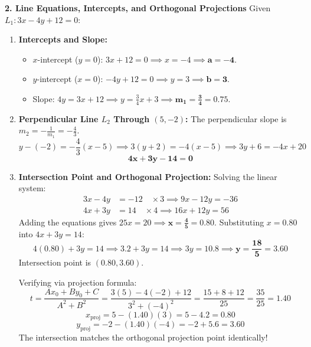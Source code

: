 \textbf{2. Line Equations, Intercepts, and Orthogonal Projections}
Given $L_1: 3x - 4y + 12 = 0$:
\begin{enumerate}
    \item \textbf{Intercepts and Slope:}
    \begin{itemize}
        \item $x$-intercept ($y=0$): $3x + 12 = 0 \implies x = -4 \implies \mathbf{a = -4}$.
        \item $y$-intercept ($x=0$): $-4y + 12 = 0 \implies y = 3 \implies \mathbf{b = 3}$.
        \item Slope: $4y = 3x + 12 \implies y = \frac{3}{4}x + 3 \implies \mathbf{m_1 = \frac{3}{4} = 0.75}$.
    \end{itemize}
    \item \textbf{Perpendicular Line $L_2$ Through $(5, -2)$:}
    The perpendicular slope is $m_2 = -\frac{1}{m_1} = -\frac{4}{3}$.
    $$y - (-2) = -\frac{4}{3}(x - 5) \implies 3(y + 2) = -4(x - 5) \implies 3y + 6 = -4x + 20$$
    $$\mathbf{4x + 3y - 14 = 0}$$
    \item \textbf{Intersection Point and Orthogonal Projection:}
    Solving the linear system:
    \begin{align*}
        3x - 4y &= -12 \quad \times 3 \implies 9x - 12y = -36 \\
        4x + 3y &= 14 \quad \times 4 \implies 16x + 12y = 56
    \end{align*}
    Adding the equations gives $25x = 20 \implies \mathbf{x = \frac{4}{5} = 0.80}$.
    Substituting $x = 0.80$ into $4x + 3y = 14$:
    $$4(0.80) + 3y = 14 \implies 3.2 + 3y = 14 \implies 3y = 10.8 \implies \mathbf{y = \frac{18}{5} = 3.60}$$
    Intersection point is $\mathbf{(0.80, 3.60)}$.
    
    Verifying via projection formula:
    $$t = \frac{Ax_0 + By_0 + C}{A^2 + B^2} = \frac{3(5) - 4(-2) + 12}{3^2 + (-4)^2} = \frac{15 + 8 + 12}{25} = \frac{35}{25} = 1.40$$
    $$x_{\text{proj}} = 5 - (1.40)(3) = 5 - 4.2 = 0.80$$
    $$y_{\text{proj}} = -2 - (1.40)(-4) = -2 + 5.6 = 3.60$$
    The intersection matches the orthogonal projection point identically!
\end{enumerate}

